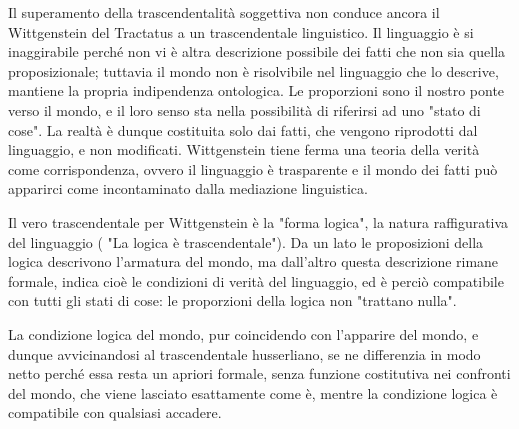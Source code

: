 Il superamento della trascendentalità
soggettiva non conduce ancora il Wittgenstein
del Tractatus a un trascendentale linguistico.
Il linguaggio è si inaggirabile perché non vi
è altra descrizione possibile dei fatti che
non sia quella proposizionale; tuttavia il
mondo non è risolvibile nel linguaggio che
lo descrive, mantiene la propria indipendenza
ontologica. Le proporzioni sono il nostro
ponte verso il mondo, e il loro senso
sta nella possibilità di riferirsi ad uno
"stato di cose". La realtà è dunque
costituita solo dai fatti, che vengono riprodotti
dal linguaggio, e non modificati.
Wittgenstein tiene ferma una teoria della
verità come corrispondenza, ovvero il
linguaggio è trasparente e il mondo dei
fatti può apparirci come incontaminato
dalla mediazione linguistica.

Il vero trascendentale per Wittgenstein è
la "forma logica", la natura raffigurativa
del linguaggio ( "La logica è trascendentale").
Da un lato le proposizioni della logica
descrivono l'armatura del mondo, ma dall'altro questa descrizione rimane formale,
indica cioè le condizioni di verità del
linguaggio, ed è perciò compatibile con
tutti gli stati di cose: le proporzioni
della logica non "trattano nulla".

La condizione logica del mondo, pur
coincidendo con l'apparire del mondo, e dunque avvicinandosi al trascendentale
husserliano, se ne differenzia in modo
netto perché essa resta un apriori formale,
senza funzione costitutiva nei confronti
del mondo, che viene lasciato esattamente
come è, mentre la condizione logica è
compatibile con qualsiasi accadere.

